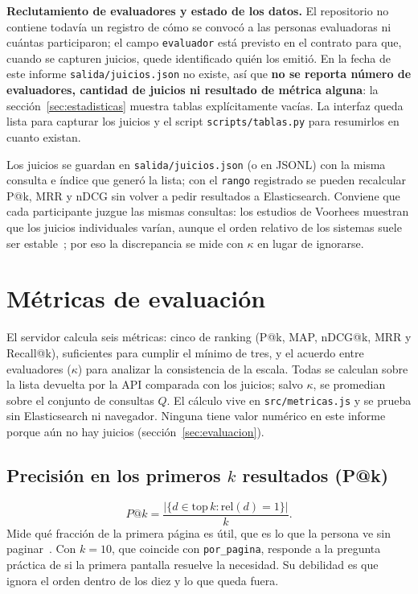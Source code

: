 \documentclass[11pt,spanish]{article}
\begin{document}
\textbf{Reclutamiento de evaluadores y estado de los datos.} El repositorio no
contiene todavía un registro de cómo se convocó a las personas evaluadoras ni
cuántas participaron; el campo \texttt{evaluador} está previsto en el contrato
para que, cuando se capturen juicios, quede identificado quién los emitió.
En la fecha de este informe \texttt{salida/juicios.json} no existe, así que
\textbf{no se reporta número de evaluadores, cantidad de juicios ni resultado
de métrica alguna}: la sección~\ref{sec:estadisticas} muestra tablas
explícitamente vacías. La interfaz queda lista para capturar los juicios y el
script \texttt{scripts/tablas.py} para resumirlos en cuanto existan.

Los juicios se guardan en \texttt{salida/juicios.json} (o en JSONL) con la
misma consulta e índice que generó la lista; con el \texttt{rango} registrado
se pueden recalcular P@k, MRR y nDCG sin volver a pedir resultados a
Elasticsearch. Conviene que cada participante juzgue las mismas consultas: los
estudios de Voorhees muestran que los juicios individuales varían, aunque el
orden relativo de los sistemas suele ser estable~\cite{voorhees2000}; por eso
la discrepancia se mide con $\kappa$ en lugar de ignorarse.

\section{Métricas de evaluación}
\label{sec:metricas}

El servidor calcula seis métricas: cinco de ranking (P@k, MAP, nDCG@k, MRR y
Recall@k), suficientes para cumplir el mínimo de tres, y el acuerdo entre
evaluadores ($\kappa$) para analizar la consistencia de la escala. Todas se calculan
sobre la lista devuelta por la API comparada con los juicios; salvo $\kappa$, se
promedian sobre el conjunto de consultas $Q$. El cálculo vive en
\texttt{src/metricas.js} y se prueba sin Elasticsearch ni navegador. Ninguna
tiene valor numérico en este informe porque aún no hay juicios
(sección~\ref{sec:evaluacion}).

\subsection{Precisión en los primeros $k$ resultados (P@k)}
\begin{equation}
  P@k = \frac{\bigl|\{d \in \mathrm{top}\,k : \mathrm{rel}(d)=1\}\bigr|}{k}.
\end{equation}
Mide qué fracción de la primera página es útil, que es lo que la persona ve
sin paginar~\cite{manning2008}. Con $k=10$, que coincide con
\texttt{por\_pagina}, responde a la pregunta práctica de si la primera pantalla
resuelve la necesidad. Su debilidad es que ignora el orden dentro de los diez
y lo que queda fuera.
\end{document}
